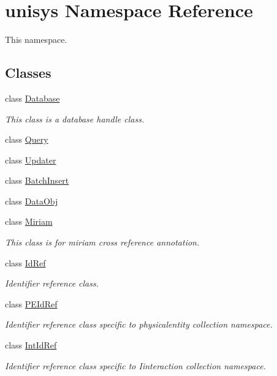 \hypertarget{namespaceunisys}{\section{unisys Namespace Reference}
\label{namespaceunisys}
}


This namespace.  


\subsection*{Classes}
\begin{DoxyCompactItemize}
\item 
class \hyperlink{classunisys_1_1Database}{Database}
\begin{DoxyCompactList}\small\item\em This class is a database handle class. \end{DoxyCompactList}\item 
class \hyperlink{classunisys_1_1Query}{Query}
\item 
class \hyperlink{classunisys_1_1Updater}{Updater}
\item 
class \hyperlink{classunisys_1_1BatchInsert}{Batch\-Insert}
\item 
class \hyperlink{classunisys_1_1DataObj}{Data\-Obj}
\item 
class \hyperlink{classunisys_1_1Miriam}{Miriam}
\begin{DoxyCompactList}\small\item\em This class is for miriam cross reference annotation. \end{DoxyCompactList}\item 
class \hyperlink{classunisys_1_1IdRef}{Id\-Ref}
\begin{DoxyCompactList}\small\item\em Identifier reference class. \end{DoxyCompactList}\item 
class \hyperlink{classunisys_1_1PEIdRef}{P\-E\-Id\-Ref}
\begin{DoxyCompactList}\small\item\em Identifier reference class specific to physicalentity collection namespace. \end{DoxyCompactList}\item 
class \hyperlink{classunisys_1_1IntIdRef}{Int\-Id\-Ref}
\begin{DoxyCompactList}\small\item\em Identifier reference class specific to Iinteraction collection namespace. \end{DoxyCompactList}\item 

\end{DoxyCompactItemize}
